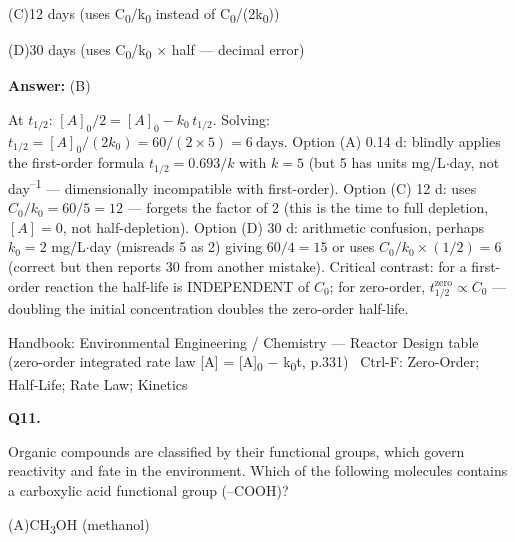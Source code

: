 \documentclass[11pt]{article}
\newcommand{\optline}[2]{\par\noindent\hspace{1.2em}(#1)\hspace{0.6em}#2}
\begin{document}
\optline{C}{12 days  (uses C\textsubscript{0}/k\textsubscript{0} instead of C\textsubscript{0}/(2k\textsubscript{0}))}
\optline{D}{30 days  (uses C\textsubscript{0}/k\textsubscript{0} $\times$ half  --- decimal error)}
\par\vspace{3pt}
\vspace{2pt}\par\noindent\colorbox{boxbg}{\parbox{\dimexpr\linewidth-2\fboxsep\relax}{%
\vspace{2pt}\textbf{Answer:} (B)\par\vspace{2pt}
{\small At $t_{1/2}$: $[A]_0/2 = [A]_0 - k_0\,t_{1/2}$. Solving: $t_{1/2} = [A]_0/(2k_0) = 60/(2\times5) = 6\ \mathrm{days}$. Option (A) 0.14 d: blindly applies the first-order formula $t_{1/2} = 0.693/k$ with $k = 5$ (but 5 has units mg/L$\cdot$day, not day\textsuperscript{--}\textsuperscript{1} --- dimensionally incompatible with first-order). Option (C) 12 d: uses $C_0/k_0 = 60/5 = 12$ --- forgets the factor of 2 (this is the time to full depletion, $[A] = 0$, not half-depletion). Option (D) 30 d: arithmetic confusion, perhaps $k_0 = 2$ mg/L$\cdot$day (misreads 5 as 2) giving $60/4 = 15$ or uses $C_0/k_0 \times (1/2) = 6$ (correct but then reports 30 from another mistake). Critical contrast: for a first-order reaction the half-life is INDEPENDENT of $C_0$; for zero-order, $t_{1/2}^{\text{zero}} \propto C_0$ --- doubling the initial concentration doubles the zero-order half-life.}\par\vspace{2pt}
{\footnotesize\color{soft}Handbook: Environmental Engineering / Chemistry --- Reactor Design table (zero-order integrated rate law [A] = [A]\textsubscript{0} $-$ k\textsubscript{0}t, p.331) \textbullet\ Ctrl-F: Zero-Order; Half-Life; Rate Law; Kinetics}\vspace{2pt}
}}
\vspace{9pt}
\filbreak
\textbf{\color{accent}Q11.}\par\vspace{2pt}
Organic compounds are classified by their functional groups, which govern reactivity and fate in the environment. Which of the following molecules contains a carboxylic acid functional group (--COOH)?\par\vspace{3pt}
\optline{A}{CH\textsubscript{3}OH  (methanol)}
\end{document}
